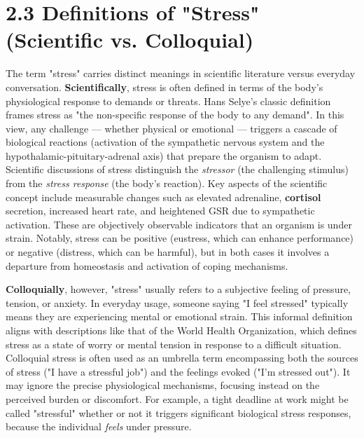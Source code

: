 \documentclass[11pt,a4paper]{report}
\begin{document}
\section{2.3 Definitions of "Stress" (Scientific vs. Colloquial)}

The term "stress" carries distinct meanings in scientific literature
versus everyday conversation. \textbf{Scientifically}, stress is often
defined in terms of the body's physiological response to demands or
threats. Hans Selye's classic definition frames stress as "the
non-specific response of the body to any
demand"\cite{StressDefinitionHH}.
In this view, any challenge --- whether physical or emotional --- triggers
a cascade of biological reactions (activation of the sympathetic nervous
system and the hypothalamic-pituitary-adrenal axis) that prepare the
organism to adapt. Scientific discussions of stress distinguish the
\textit{stressor} (the challenging stimulus) from the \textit{stress response} (the
body's reaction). Key aspects of the scientific concept include
measurable changes such as elevated adrenaline, \textbf{cortisol} secretion,
increased heart rate, and heightened GSR due to sympathetic
activation\cite{CortisolStressIndicator2020}.
These are objectively observable indicators that an organism is under
strain. Notably, stress can be positive (eustress, which can enhance
performance) or negative (distress, which can be harmful), but in both
cases it involves a departure from homeostasis and activation of coping
mechanisms.

\textbf{Colloquially}, however, "stress" usually refers to a subjective
feeling of pressure, tension, or anxiety. In everyday usage, someone
saying "I feel stressed" typically means they are experiencing mental or
emotional strain. This informal definition aligns with descriptions like
that of the World Health Organization, which defines stress as a state
of worry or mental tension in response to a difficult
situation\cite{WHOStressDefinition}.
Colloquial stress is often used as an umbrella term encompassing both
the sources of stress ("I have a stressful job") and the feelings evoked
("I'm stressed out"). It may ignore the precise physiological
mechanisms, focusing instead on the perceived burden or discomfort. For
example, a tight deadline at work might be called "stressful" whether or
not it triggers significant biological stress responses, because the
individual \textit{feels} under pressure.
\end{document}
